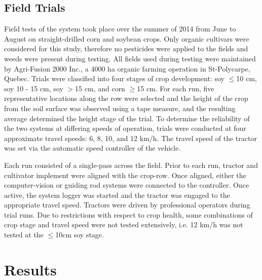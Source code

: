 \documentclass[authoryear]{elsarticle}
\begin{document}
\subsection{Field Trials}
Field tests of the system took place over the summer of 2014 from June
to August on straight-drilled corn and soybean crops. Only organic
cultivars were considered for this study, therefore no pesticides were
applied to the fields and weeds were present during testing. All
fields used during testing were maintained by Agri-Fusion 2000 Inc., a
4000 ha organic farming operation in St-Polycarpe, Quebec. Trials were
classified into four stages of crop development: soy $\le$10 cm, soy 10 - 15
cm, soy $>$15 cm, and corn $\ge$15 cm. For each run, five representative
locations along the row were selected and the height of the crop from
the soil surface was observed using a tape measure, and the resulting
average determined the height stage of the trial. To determine the
reliability of the two systems at differing speeds of operation,
trials were conducted at four approximate travel speeds: 6, 8, 10, and
12 km/h. The travel speed of the tractor was set via the automatic
speed controller of the vehicle.

Each run consisted of a single-pass across the field. Prior to each
run, tractor and cultivator implement were aligned with the crop-row.
Once aligned, either the computer-vision or guiding rod systems were
connected to the controller. Once active, the system logger was
started and the tractor was engaged to the appropriate travel
speed. Tractors were driven by professional operators during trial runs.
Due to restrictions with respect to crop health, some
combinations of crop stage and travel speed were not tested
extensively, i.e. 12 km/h was not tested at the $\le$10cm soy stage.

\section{Results}
\end{document}
